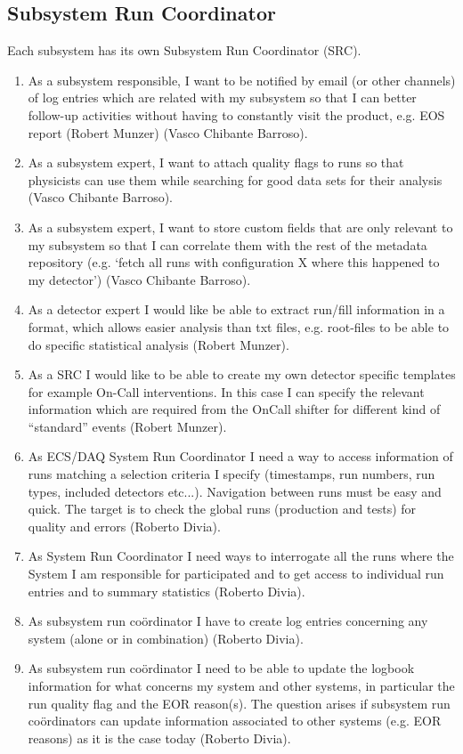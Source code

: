 \subsection{Subsystem Run Coordinator}
Each subsystem has its own Subsystem Run Coordinator (SRC). 
\begin{enumerate}
  \item As a subsystem responsible, I want to be notified by email (or other channels) of log entries which are related with my subsystem so that I can better follow-up activities without having to constantly visit the product, e.g. EOS report (Robert Munzer) (Vasco Chibante Barroso). 
  \item As a subsystem expert, I want to attach quality flags to runs so that physicists can use them while searching for good data sets for their analysis (Vasco Chibante Barroso). 
  \item As a subsystem expert, I want to store custom fields that are only relevant to my subsystem so that I can correlate them with the rest of the metadata repository (e.g. ‘fetch all runs with configuration X where this happened to my detector’) (Vasco Chibante Barroso). 
  \item As a detector expert I would like be able to extract run/fill information in a format, which allows easier
analysis than txt files, e.g. root-files to be able to do specific statistical analysis (Robert Munzer).
  \item As a SRC I would like to be able to create my own detector specific templates for example On-Call interventions. In this case I can specify the relevant information which are required from the OnCall shifter for different kind of “standard” events (Robert Munzer).
  \item As ECS/DAQ System Run Coordinator I need a way to access information of runs matching a selection criteria I specify (timestamps, run numbers, run types, included detectors etc...). Navigation between runs must be easy and quick. The target is to check the global runs (production and tests) for quality and errors (Roberto Divia).
  \item As System Run Coordinator I need ways to interrogate all the runs where the System I am responsible for participated and to get access to individual run entries and to summary statistics (Roberto Divia).
  \item As subsystem run co\"ordinator I have to create log entries concerning any system (alone or in combination) (Roberto Divia).
  \item As subsystem run co\"ordinator I need to be able to update the logbook information for what concerns my system and other systems, in particular the run quality flag and the EOR reason(s). The question arises if subsystem run co\"ordinators can update information associated to other systems (e.g. EOR reasons) as it is the case today (Roberto Divia).

\end{enumerate}

